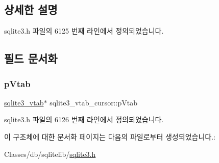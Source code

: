 \subsection{상세한 설명}


sqlite3.\+h 파일의 6125 번째 라인에서 정의되었습니다.



\subsection{필드 문서화}
\mbox{\label{structsqlite3__vtab__cursor_a2989d9f84a35506c3ef9fe9e9ecd3365}} 
\subsubsection{\texorpdfstring{p\+Vtab}{pVtab}}
{\footnotesize\ttfamily \hyperlink{structsqlite3__vtab}{sqlite3\+\_\+vtab}$\ast$ sqlite3\+\_\+vtab\+\_\+cursor\+::p\+Vtab}



sqlite3.\+h 파일의 6126 번째 라인에서 정의되었습니다.



이 구조체에 대한 문서화 페이지는 다음의 파일로부터 생성되었습니다.\+:\begin{DoxyCompactItemize}
\item 
Classes/db/sqlitelib/\hyperlink{sqlite3_8h}{sqlite3.\+h}\end{DoxyCompactItemize}

